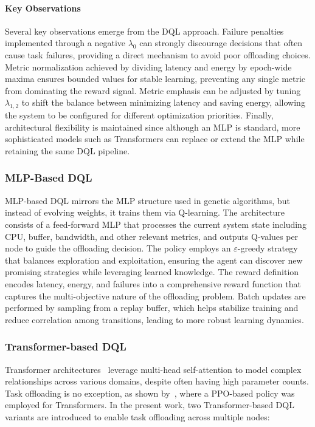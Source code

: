 \documentclass[preprint,3p,authoryear]{elsarticle}
\begin{document}
\paragraph{Key Observations}
Several key observations emerge from the DQL approach. Failure penalties implemented through a negative \(\lambda_{0}\) can strongly discourage decisions that often cause task failures, providing a direct mechanism to avoid poor offloading choices. Metric normalization achieved by dividing latency and energy by epoch-wide maxima ensures bounded values for stable learning, preventing any single metric from dominating the reward signal. Metric emphasis can be adjusted by tuning \(\lambda_{1,2}\) to shift the balance between minimizing latency and saving energy, allowing the system to be configured for different optimization priorities. Finally, architectural flexibility is maintained since although an MLP is standard, more sophisticated models such as Transformers can replace or extend the MLP while retaining the same DQL pipeline.

\subsubsection{MLP-Based DQL}\label{subsubsec:mlp_DQL}
MLP-based DQL mirrors the MLP structure used in genetic algorithms, but instead of evolving weights, it trains them via Q-learning. The architecture consists of a feed-forward MLP that processes the current system state including CPU, buffer, bandwidth, and other relevant metrics, and outputs Q-values per node to guide the offloading decision. The policy employs an \(\varepsilon\)-greedy strategy that balances exploration and exploitation, ensuring the agent can discover new promising strategies while leveraging learned knowledge. The reward definition encodes latency, energy, and failures into a comprehensive reward function that captures the multi-objective nature of the offloading problem. Batch updates are performed by sampling from a replay buffer, which helps stabilize training and reduce correlation among transitions, leading to more robust learning dynamics.


\subsubsection{Transformer-based DQL}\label{subsubsec:transformers}

Transformer architectures~\citep{vaswani2023attentionneed} leverage multi-head self-attention to model complex relationships across various domains, despite often having high parameter counts. Task offloading is no exception, as shown by~\citet{gholipour_tpto_2023}, where a PPO-based policy was employed for Transformers. In the present work, two Transformer-based DQL variants are introduced to enable task offloading across multiple nodes:
\end{document}
